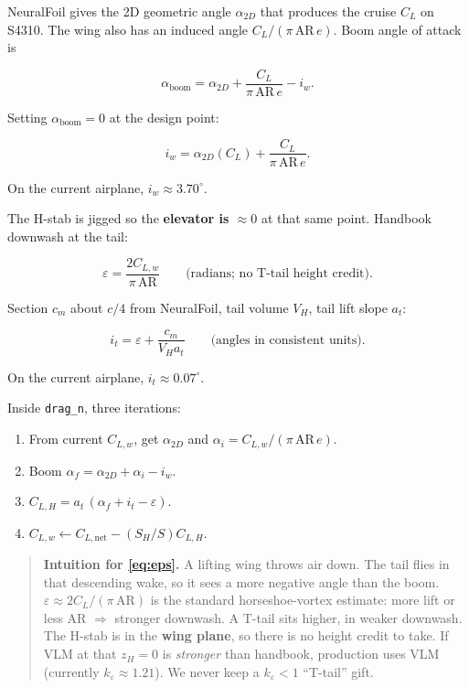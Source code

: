 \documentclass[11pt,letterpaper]{article}
\newcommand{\code}[1]{\texttt{#1}}
\newenvironment{intuition}{\begin{quote}\small}{\end{quote}}
\begin{document}
NeuralFoil gives the 2D geometric angle $\alpha_{2D}$ that produces the cruise $C_L$ on S4310. The wing also has an induced angle $C_L/(\pi\,\mathrm{AR}\,e)$. Boom angle of attack is

\begin{equation}
  \alpha_\mathrm{boom} = \alpha_{2D} + \frac{C_L}{\pi\,\mathrm{AR}\,e} - i_w.
\end{equation}

Setting $\alpha_\mathrm{boom}=0$ at the design point:

\begin{equation}
  i_w = \alpha_{2D}(C_L) + \frac{C_L}{\pi\,\mathrm{AR}\,e}.
\label{eq:iw}
\end{equation}

On the current airplane, $i_w \approx 3.70^\circ$.

The H-stab is jigged so the \textbf{elevator is $\approx 0$} at that same point. Handbook downwash at the tail:

\begin{equation}
  \varepsilon = \frac{2 C_{L,w}}{\pi\,\mathrm{AR}}
  \qquad \text{(radians; no T-tail height credit)}.
\label{eq:eps}
\end{equation}

Section $c_m$ about $c/4$ from NeuralFoil, tail volume $V_H$, tail lift slope $a_t$:

\begin{equation}
  i_t = \varepsilon + \frac{c_m}{V_H a_t}
  \qquad \text{(angles in consistent units)}.
\label{eq:it}
\end{equation}

On the current airplane, $i_t \approx 0.07^\circ$.

Inside \code{drag\_n}, three iterations:

\begin{enumerate}
  \item From current $C_{L,w}$, get $\alpha_{2D}$ and $\alpha_i = C_{L,w}/(\pi\,\mathrm{AR}\,e)$.
  \item Boom $\alpha_f = \alpha_{2D} + \alpha_i - i_w$.
  \item $C_{L,H} = a_t\,(\alpha_f + i_t - \varepsilon)$.
  \item $C_{L,w} \leftarrow C_{L,\mathrm{net}} - (S_H/S) C_{L,H}$.
\end{enumerate}

\begin{intuition}
\textbf{Intuition for \eqref{eq:eps}.} A lifting wing throws air down. The tail flies in that descending wake, so it sees a more negative angle than the boom. $\varepsilon \approx 2C_L/(\pi\,\mathrm{AR})$ is the standard horseshoe-vortex estimate: more lift or less AR $\Rightarrow$ stronger downwash. A T-tail sits higher, in weaker downwash. The H-stab is in the \textbf{wing plane}, so there is no height credit to take. If VLM at that $z_H=0$ is \emph{stronger} than handbook, production uses VLM (currently $k_\varepsilon \approx 1.21$). We never keep a $k_\varepsilon<1$ ``T-tail'' gift.
\end{intuition}
\end{document}
